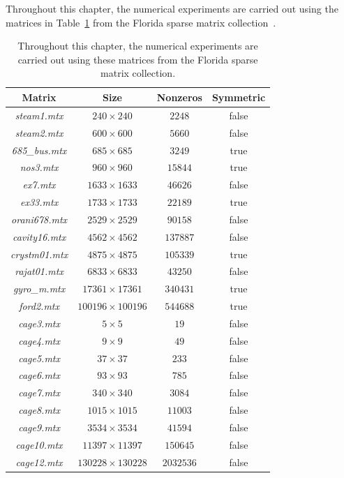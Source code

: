 \documentclass[12pt, twoside,a4paper,toc=bibliography]{scrbook}
\begin{document}
Throughout this chapter, the numerical experiments are carried out using 
the matrices in Table~\ref{florida.mats} from the Florida sparse matrix collection~\cite{florida.matrices}.
\begin{table}
\centering
\begin{tabular}{|c|c|c|c|}
\hline
Matrix & Size & Nonzeros & Symmetric\\\hline
\textit{steam1.mtx} & $240\times 240$ & $2248$ & false\\\hline
\textit{steam2.mtx} & $600\times 600$ & $5660$ & false\\\hline
\textit{685\_bus.mtx} & $685\times 685$ & $3249$ & true\\\hline
\textit{nos3.mtx} & $960\times 960$ & $15844$ & true\\\hline
\textit{ex7.mtx} & $1633\times 1633$ & $46626$ & false\\\hline
\textit{ex33.mtx} & $1733\times 1733$ & $22189$ & true\\\hline
\textit{orani678.mtx} & $2529\times 2529$ & $90158$ & false\\\hline
\textit{cavity16.mtx} & $4562\times 4562$ & $137887$ & false\\\hline
\textit{crystm01.mtx} & $4875\times 4875$ & $105339$ & true\\\hline
\textit{rajat01.mtx} & $6833\times 6833$ & $43250$ & false\\\hline
\textit{gyro\_m.mtx} & $17361\times 17361$ & $340431$ & true\\\hline
\textit{ford2.mtx} & $100196\times 100196$ & $544688$ & true\\\hline
\textit{cage3.mtx} & $5\times 5$ & $19$ & false\\\hline
\textit{cage4.mtx} & $9\times 9$ & $49$ & false\\\hline
\textit{cage5.mtx} & $37\times 37$ & $233$ & false\\\hline
\textit{cage6.mtx} & $93\times 93$ & $785$ & false\\\hline
\textit{cage7.mtx} & $340\times 340$ & $3084$ & false\\\hline
\textit{cage8.mtx} & $1015\times 1015$ & $11003$ & false\\\hline
\textit{cage9.mtx} & $3534\times 3534$ & $41594$ & false\\\hline
\textit{cage10.mtx} & $11397\times 11397$ & $150645$ & false\\\hline
\textit{cage12.mtx} & $130228\times 130228$ & $2032536$ & false\\\hline
\end{tabular}
\caption{
Throughout this chapter, the numerical experiments are carried out using 
these matrices from the Florida sparse matrix collection.}
\label{florida.mats}
\end{table}
\end{document}
